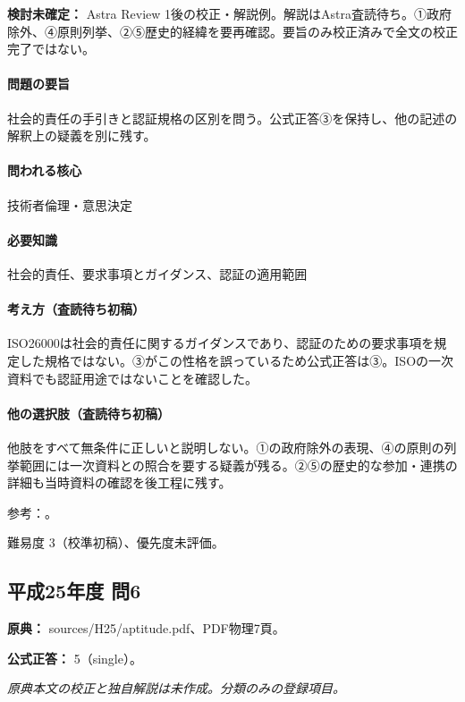 \par\textbf{検討未確定：} Astra Review 1後の校正・解説例。解説はAstra査読待ち。①政府除外、④原則列挙、②⑤歴史的経緯を要再確認。要旨のみ校正済みで全文の校正完了ではない。

\paragraph{問題の要旨} 社会的責任の手引きと認証規格の区別を問う。公式正答③を保持し、他の記述の解釈上の疑義を別に残す。

\paragraph{問われる核心} 技術者倫理・意思決定

\paragraph{必要知識} 社会的責任、要求事項とガイダンス、認証の適用範囲

\paragraph{考え方（査読待ち初稿）} ISO26000は社会的責任に関するガイダンスであり、認証のための要求事項を規定した規格ではない。③がこの性格を誤っているため公式正答は③。ISOの一次資料でも認証用途ではないことを確認した。

\paragraph{他の選択肢（査読待ち初稿）} 他肢をすべて無条件に正しいと説明しない。①の政府除外の表現、④の原則の列挙範囲には一次資料との照合を要する疑義が残る。②⑤の歴史的な参加・連携の詳細も当時資料の確認を後工程に残す。

\par 参考：\cite{iso26000}。

\par 難易度 3（校準初稿）、優先度未評価。

\subsection{平成25年度 問6}
\label{q:h25-reg-apt-06}

\noindent\textbf{原典：} sources/H25/aptitude.pdf、PDF物理7頁。

\textbf{公式正答：} 5（single）。

\par\textit{原典本文の校正と独自解説は未作成。分類のみの登録項目。}

